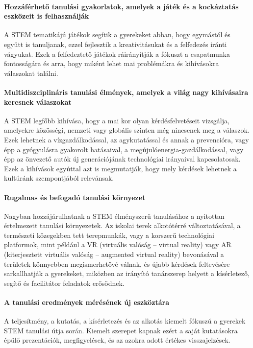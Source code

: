 \paragraph{Hozzáférhető tanulási gyakorlatok, amelyek a játék és a kockáztatás
  eszközeit is felhasználják} A STEM tematikájú játékok segítik a gyerekeket
abban, hogy egymástól és együtt is tanuljanak, ezzel fejlesztik a
kreativitásukat és a felfedezés iránti vágyukat. Ezek a felfedeztető játékok
ráirányítják a fókuszt a csapatmunka fontosságára és arra, hogy miként lehet
mai problémákra és kihívásokra válaszokat találni.

\paragraph{Multidiszciplináris tanulási élmények, amelyek a világ nagy
  kihívásaira keresnek válaszokat} A STEM legfőbb kihívása, hogy a mai kor olyan
kérdésfelvetéseit vizsgálja, amelyekre közösségi, nemzeti vagy globális
szinten még nincsenek meg a válaszok. Ezek lehetnek a vízgazdálkodással, az
agykutatással és annak a prevencióra, vagy épp a gyógyulásra gyakorolt
hatásaival, a megújulóenergia-gazdálkodással, vagy épp az önvezető autók új
generációjának technológiai irányaival kapcsolatosak. Ezek a kihívások egyúttal
azt is megmutatják, hogy mely kérdések lehetnek a kultúránk szempontjából
relevánsak.

\paragraph{Rugalmas és befogadó tanulási környezet} Nagyban hozzájárulhatnak a
STEM élményszerű tanulásához a nyitottan értelmezett tanulási környezetek. Az
iskolai terek alkotótérré változtatásával, a természeti közegekben tett
terepmunkák, vagy a korszerű technológiai platformok, mint például a VR
(virtuális valóság – virtual reality) vagy AR (kiterjesztett virtuális valóság
– augmented virtual reality) bevonásával a területek könnyebben megismerhetővé
válnak, és újabb kérdések feltevésére sarkallhatják a gyerekeket, miközben az
irányító tanárszerep helyett a kísérletező, segítő és facilitátor feladatok
erősödnek.

\paragraph{A tanulási eredmények mérésének új eszköztára} A teljesítmény, a
kutatás, a kísérletezés és az alkotás kiemelt fókuszú a gyerekek STEM tanulási
útja során. Kiemelt szerepet kapnak ezért a saját kutatásokra épülő
prezentációk, megfigyelések, és az azokra adott értékes visszajelzések.

